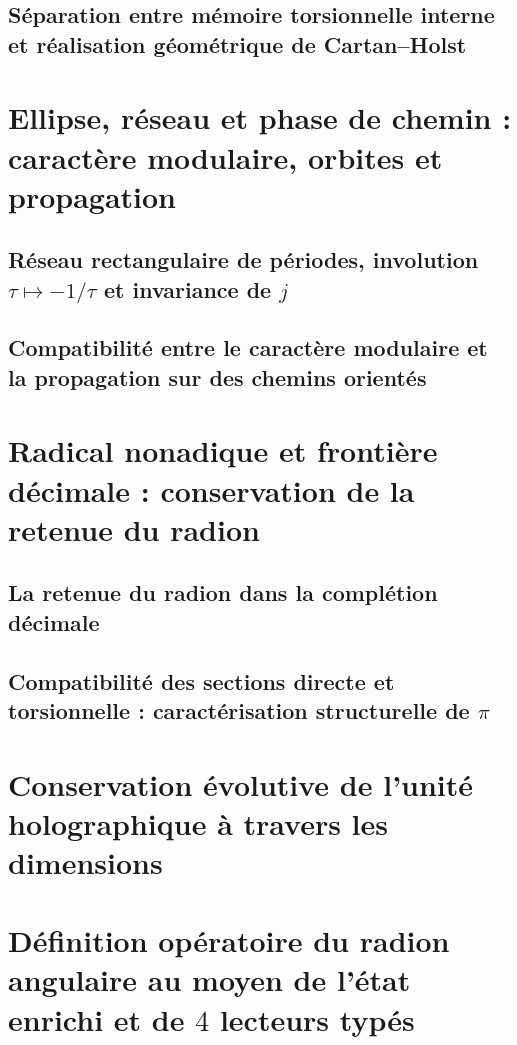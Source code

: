 \subsection{Séparation entre mémoire torsionnelle interne et réalisation géométrique de Cartan--Holst}


\section{Ellipse, réseau et phase de chemin : caractère modulaire, orbites et propagation}
\subsection{Réseau rectangulaire de périodes, involution \(\tau\mapsto-1/\tau\) et invariance de \(j\)}

\subsection{Compatibilité entre le caractère modulaire et la propagation sur des chemins orientés}


\section{Radical nonadique et frontière décimale : conservation de la retenue du radion}
\subsection{La retenue du radion dans la complétion décimale}

\subsection{Compatibilité des sections directe et torsionnelle : caractérisation structurelle de \(\pi\)}


\section{Conservation évolutive de l'unité holographique à travers les dimensions}


\section{Définition opératoire du radion angulaire au moyen de l'état enrichi et de \(4\) lecteurs typés}

